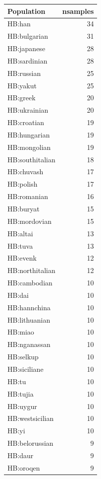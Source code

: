 \begin{table}
\small
\begin{tabular}{l|r}
\hline
Population & nsamples\\
\hline
HB:han & 34\\
\hline
HB:bulgarian & 31\\
\hline
HB:japanese & 28\\
\hline
HB:sardinian & 28\\
\hline
HB:russian & 25\\
\hline
HB:yakut & 25\\
\hline
HB:greek & 20\\
\hline
HB:ukrainian & 20\\
\hline
HB:croatian & 19\\
\hline
HB:hungarian & 19\\
\hline
HB:mongolian & 19\\
\hline
HB:southitalian & 18\\
\hline
HB:chuvash & 17\\
\hline
HB:polish & 17\\
\hline
HB:romanian & 16\\
\hline
HB:buryat & 15\\
\hline
HB:mordovian & 15\\
\hline
HB:altai & 13\\
\hline
HB:tuva & 13\\
\hline
HB:evenk & 12\\
\hline
HB:northitalian & 12\\
\hline
HB:cambodian & 10\\
\hline
HB:dai & 10\\
\hline
HB:hannchina & 10\\
\hline
HB:lithuanian & 10\\
\hline
HB:miao & 10\\
\hline
HB:nganassan & 10\\
\hline
HB:selkup & 10\\
\hline
HB:siciliane & 10\\
\hline
HB:tu & 10\\
\hline
HB:tujia & 10\\
\hline
HB:uygur & 10\\
\hline
HB:westsicilian & 10\\
\hline
HB:yi & 10\\
\hline
HB:belorussian & 9\\
\hline
HB:daur & 9\\
\hline
HB:oroqen & 9\\
\hline

\end{tabular}
\end{table}
